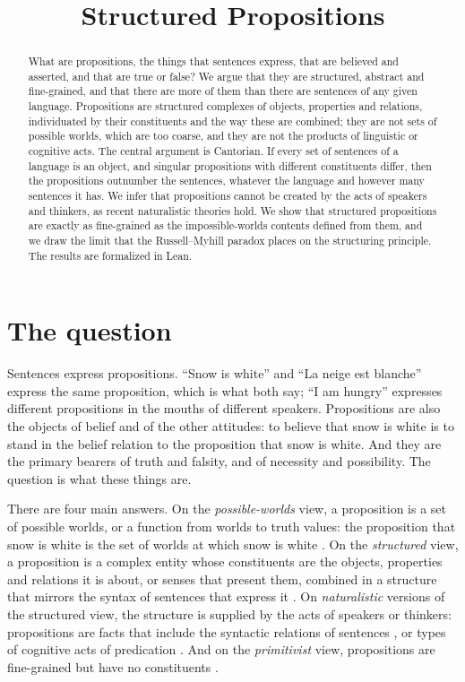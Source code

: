 \documentclass{situationist-preprint}
\title{Structured Propositions}
\begin{document}
\maketitle

\begin{abstract}
What are propositions, the things that sentences express, that are believed and asserted, and that are true or false? We argue that they are structured, abstract and fine-grained, and that there are more of them than there are sentences of any given language. Propositions are structured complexes of objects, properties and relations, individuated by their constituents and the way these are combined; they are not sets of possible worlds, which are too coarse, and they are not the products of linguistic or cognitive acts. The central argument is Cantorian. If every set of sentences of a language is an object, and singular propositions with different constituents differ, then the propositions outnumber the sentences, whatever the language and however many sentences it has. We infer that propositions cannot be created by the acts of speakers and thinkers, as recent naturalistic theories hold. We show that structured propositions are exactly as fine-grained as the impossible-worlds contents defined from them, and we draw the limit that the Russell--Myhill paradox places on the structuring principle. The results are formalized in Lean.
\end{abstract}

\section{The question}

Sentences express propositions. \enquote{Snow is white} and \enquote{La neige est blanche} express the same proposition, which is what both say; \enquote{I am hungry} expresses different propositions in the mouths of different speakers. Propositions are also the objects of belief and of the other attitudes: to believe that snow is white is to stand in the belief relation to the proposition that snow is white. And they are the primary bearers of truth and falsity, and of necessity and possibility. The question is what these things are.

There are four main answers. On the \emph{possible-worlds} view, a proposition is a set of possible worlds, or a function from worlds to truth values: the proposition that snow is white is the set of worlds at which snow is white \citep{Carnap1947,Stalnaker1984}. On the \emph{structured} view, a proposition is a complex entity whose constituents are the objects, properties and relations it is about, or senses that present them, combined in a structure that mirrors the syntax of sentences that express it \citep{Russell1903,Kaplan1989,Salmon1986,Soames1987}. On \emph{naturalistic} versions of the structured view, the structure is supplied by the acts of speakers or thinkers: propositions are facts that include the syntactic relations of sentences \citep{King2007}, or types of cognitive acts of predication \citep{Soames2010,Hanks2015}. And on the \emph{primitivist} view, propositions are fine-grained but have no constituents \citep{Merricks2015}.
\end{document}
